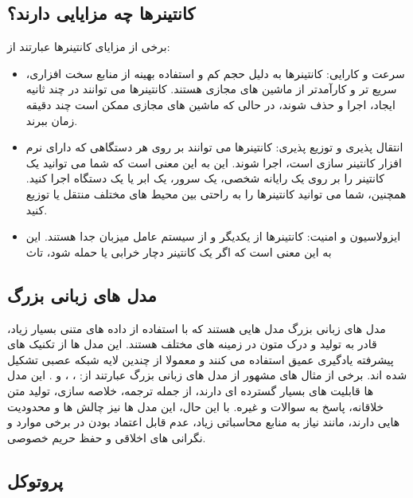 \subsection{کانتینرها چه مزایایی دارند؟}

برخی از مزایای کانتینرها عبارتند از:
\begin{itemize}[label=-]
\item
سرعت و کارایی: کانتینرها به دلیل حجم کم و استفاده بهینه از منابع سخت افزاری، سریع تر و کارآمدتر از ماشین های مجازی هستند. کانتینرها می توانند در چند ثانیه ایجاد، اجرا و حذف شوند، در حالی که ماشین های مجازی ممکن است چند دقیقه زمان ببرند.
\item
انتقال پذیری و توزیع پذیری: کانتینرها می توانند بر روی هر دستگاهی که دارای نرم افزار کانتینر سازی است، اجرا شوند. این به این معنی است که شما می توانید یک کانتینر را بر روی یک رایانه شخصی، یک سرور، یک ابر یا یک دستگاه  اجرا کنید. همچنین، شما می توانید کانتینرها را به راحتی بین محیط های مختلف منتقل یا توزیع کنید.
\item
ایزولاسیون و امنیت: کانتینرها از یکدیگر و از سیستم عامل میزبان جدا هستند. این به این معنی است که اگر یک کانتینر دچار خرابی یا حمله شود، تاث
\end{itemize}

\subsection{مدل های زبانی بزرگ}
مدل های زبانی بزرگ مدل هایی هستند که با استفاده از داده های متنی بسیار زیاد، قادر به تولید و درک متون در زمینه های مختلف هستند. این مدل ها از تکنیک های پیشرفته یادگیری عمیق استفاده می کنند و معمولا از چندین لایه شبکه عصبی تشکیل شده اند. برخی از مثال های مشهور از مدل های زبانی بزرگ عبارتند از: ، ،  و . این مدل ها قابلیت های بسیار گسترده ای دارند، از جمله ترجمه، خلاصه سازی، تولید متن خلاقانه، پاسخ به سوالات و غیره. با این حال، این مدل ها نیز چالش ها و محدودیت هایی دارند، مانند نیاز به منابع محاسباتی زیاد، عدم قابل اعتماد بودن در برخی موارد و نگرانی های اخلاقی و حفظ حریم خصوصی.

\subsection{پروتوکل }

